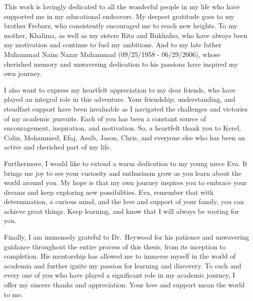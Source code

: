 \documentclass[12pt, final]{dalcsthesis}
\begin{document}
\begin{acknowledgements}
	This work is lovingly dedicated to all the wonderful people in my life who have supported me in my educational endeavors. My deepest gratitude goes to my brother Frebarz, who consistently encouraged me to reach new heights. To my mother, Khalima, as well as my sisters Rita and Rukhafzo, who have always been my motivation and continue to fuel my ambitions. And to my late father Muhammad Naim Nazar Muhammad (09/25/1958 - 06/29/2006), whose cherished memory and unwavering dedication to his passions have inspired my own journey.

	I also want to express my heartfelt appreciation to my dear friends, who have played an integral role in this adventure. Your friendship, understanding, and steadfast support have been invaluable as I navigated the challenges and victories of my academic pursuits. Each of you has been a constant source of encouragement, inspiration, and motivation. So, a heartfelt thank you to Kerel, Colin, Mohammed, Efaj, Assib, Jason, Chris, and everyone else who has been an active and cherished part of my life.

	Furthermore, I would like to extend a warm dedication to my young niece Eva. It brings me joy to see your curiosity and enthusiasm grow as you learn about the world around you. My hope is that my own journey inspires you to embrace your dreams and keep exploring new possibilities. Eva, remember that with determination, a curious mind, and the love and support of your family, you can achieve great things. Keep learning, and know that I will always be rooting for you.

	Finally, I am immensely grateful to Dr.\ Heywood for his patience and unwavering guidance throughout the entire process of this thesis, from its inception to completion. His mentorship has allowed me to immerse myself in the world of academia and further ignite my passion for learning and discovery. To each and every one of you who have played a significant role in my academic journey, I offer my sincere thanks and appreciation. Your love and support mean the world to me.
\end{acknowledgements}

\mainmatter
\end{document}
